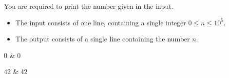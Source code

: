 \documentclass{bapc}
\begin{document}

\newcommand{\maxn}{10^5}

You are required to print the number given in the input.

\begin{Input}
	\begin{itemize}
		\item The input consists of one line, containing a single integer $0\leq n\leq \maxn$.
	\end{itemize}
\end{Input}

\begin{Output}
	\begin{itemize}
		\item The output consists of a single line containing the number $n$.
	\end{itemize}
\end{Output}

\begin{Sample}
	0 & 0 \\
\end{Sample}

\begin{Sample}
	42 %
	&
	42 %
	\\
\end{Sample}
\end{document}
